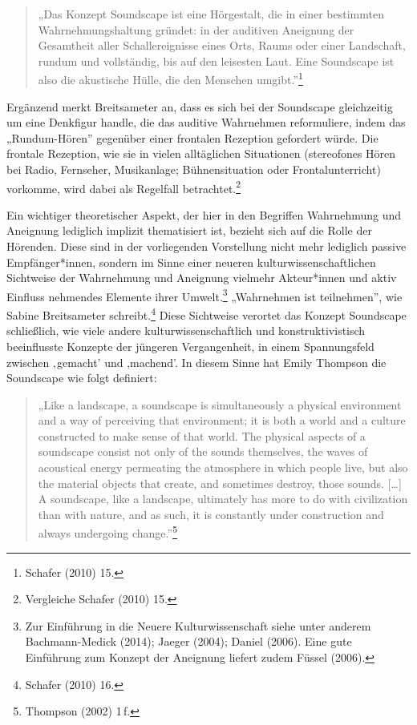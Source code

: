 \documentclass[a4paper,
fontsize=11pt,
oneside,
numbers=noperiodatend,
parskip=half-,
bibliography=totoc,
final
]{scrartcl}
\begin{document}
\begin{quote}
„Das Konzept Soundscape ist eine Hörgestalt, die in einer bestimmten
Wahrnehmungshaltung gründet: in der auditiven Aneignung der Gesamtheit
aller Schallereignisse eines Orts, Raums oder einer Landschaft, rundum
und vollständig, bis auf den leisesten Laut. Eine Soundscape ist also
die akustische Hülle, die den Menschen umgibt.''\footnote{Schafer (2010)
  15.}
\end{quote}

Ergänzend merkt Breitsameter an, dass es sich bei der Soundscape
gleichzeitig um eine Denkfigur handle, die das auditive Wahrnehmen
reformuliere, indem das „Rundum-Hören'' gegenüber einer frontalen
Rezeption gefordert würde. Die frontale Rezeption, wie sie in vielen
alltäglichen Situationen (stereofones Hören bei Radio, Fernseher,
Musikanlage; Bühnensituation oder Frontalunterricht) vorkomme, wird
dabei als Regelfall betrachtet.\footnote{Vergleiche Schafer (2010) 15.}

Ein wichtiger theoretischer Aspekt, der hier in den Begriffen
Wahrnehmung und Aneignung lediglich implizit thematisiert ist, bezieht
sich auf die Rolle der Hörenden. Diese sind in der vorliegenden
Vorstellung nicht mehr lediglich passive Empfänger*innen, sondern im
Sinne einer neueren kulturwissenschaftlichen Sichtweise der Wahrnehmung
und Aneignung vielmehr Akteur*innen und aktiv Einfluss nehmendes
Elemente ihrer Umwelt.\footnote{Zur Einführung in die Neuere
  Kulturwissenschaft siehe unter anderem Bachmann-Medick (2014); Jaeger
  (2004); Daniel (2006). Eine gute Einführung zum Konzept der Aneignung
  liefert zudem Füssel (2006).} „Wahrnehmen ist teilnehmen'', wie Sabine
Breitsameter schreibt.\footnote{Schafer (2010) 16.} Diese Sichtweise
verortet das Konzept Soundscape schließlich, wie viele andere
kulturwissenschaftlich und konstruktivistisch beeinflusste Konzepte der
jüngeren Vergangenheit, in einem Spannungsfeld zwischen ‚gemacht' und
‚machend'. In diesem Sinne hat Emily Thompson die Soundscape wie folgt
definiert:

\begin{quote}
„Like a landscape, a soundscape is simultaneously a physical environment
and a way of perceiving that environment; it is both a world and a
culture constructed to make sense of that world. The physical aspects of
a soundscape consist not only of the sounds themselves, the waves of
acoustical energy permeating the atmosphere in which people live, but
also the material objects that create, and sometimes destroy, those
sounds. {[}\ldots{]} A soundscape, like a landscape, ultimately has more
to do with civilization than with nature, and as such, it is constantly
under construction and always undergoing change.''\footnote{Thompson
  (2002) 1\,f.}
\end{quote}
\end{document}
